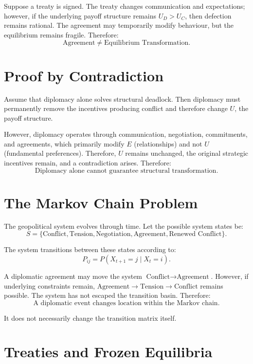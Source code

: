 \documentclass[11pt,openany]{book}
\theoremstyle{plain}
\theoremstyle{definition}
\begin{document}
Suppose a treaty is signed. The treaty changes communication and expectations; however, if the underlying payoff structure remains \(U_D > U_C\), then defection remains rational. The agreement may temporarily modify behaviour, but the equilibrium remains fragile. Therefore:
\[
\text{Agreement}
\neq
\text{Equilibrium Transformation}.
\]

\section*{Proof by Contradiction}

Assume that diplomacy alone solves structural deadlock. Then diplomacy must permanently remove the incentives producing conflict and therefore change \(U\), the payoff structure. 

However, diplomacy operates through communication, negotiation, commitments, and agreements, which primarily modify \(E\) (relationships) and not \(U\) (fundamental preferences). Therefore, \(U\) remains unchanged, the original strategic incentives remain, and a contradiction arises. Therefore:
\[
\boxed{
\text{Diplomacy alone cannot guarantee structural transformation.}
}
\]

\section*{The Markov Chain Problem}

The geopolitical system evolves through time. Let the possible system states be:
\[
S = \{\text{Conflict}, \text{Tension}, \text{Negotiation}, \text{Agreement}, \text{Renewed Conflict}\}.
\]

The system transitions between these states according to:
\[
P_{ij} = P(X_{t+1} = j \mid X_t = i).
\]

A diplomatic agreement may move the system \(\text{Conflict} \to \text{Agreement}\). However, if underlying constraints remain, \(\text{Agreement} \to \text{Tension} \to \text{Conflict}\) remains possible. The system has not escaped the transition basin. Therefore:
\[
\boxed{
\text{A diplomatic event changes location within the Markov chain.}
}
\]

It does not necessarily change the transition matrix itself.

\section*{Treaties and Frozen Equilibria}
\end{document}
